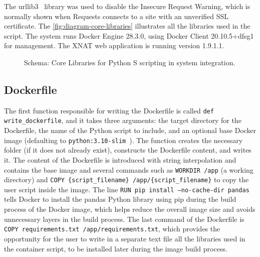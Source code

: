The urllib3~\cite{urllib3} library was used to disable the Insecure Request Warning, which is normally shown when Requests connects to a site with an unverified SSL certificate. The \autoref{fig:diagram-core-libraries} illustrates all the libraries used in the script.
The system runs Docker Engine 28.3.0, using Docker Client 20.10.5+dfsg1 for management. The XNAT web application is running version 1.9.1.1.

\begin{figure}[H]
  \centering
  \def\svgwidth{0.4\linewidth}
  
  \caption{Schema: Core Libraries for Python S
  scripting in system integration.}
  \label{fig:diagram-core-libraries}
\end{figure}
 
  \subsection{Dockerfile}
 
The first function responsible for writing the Dockerfile is called \texttt{def write\_dockerfile}, and it takes three arguments: the target directory for the Dockerfile, the name of the Python script to include, and an optional base Docker image (defaulting to \texttt{python:3.10-slim}~\cite{Dockerbaseimage}). The function creates the necessary folder (if it does not already exist), constructs the Dockerfile content, and writes it. The content of the Dockerfile is introduced with string interpolation and contains the base image and several commands such as \texttt{WORKDIR /app} (a working directory) and \texttt{COPY \{script\_filename\} /app/\{script\_filename\}} to copy the user script inside the image. The line \texttt{RUN pip install --no-cache-dir pandas} tells Docker to install the pandas Python library using pip during the build process of the Docker image, which helps reduce the overall image size and avoids unnecessary layers in the build process. The last command of the Dockerfile is \texttt{COPY requirements.txt /app/requirements.txt}, which provides the opportunity for the user to write in a separate text file all the libraries used in the container script, to be installed later during the image build process.




